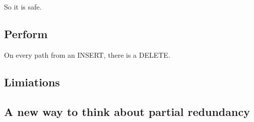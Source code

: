 So it is safe.

\subsection{Perform}
On every path from an INSERT, there is a DELETE.


\subsection{Limiations}




\subsection{A new way to think about partial redundancy}

























    
   



